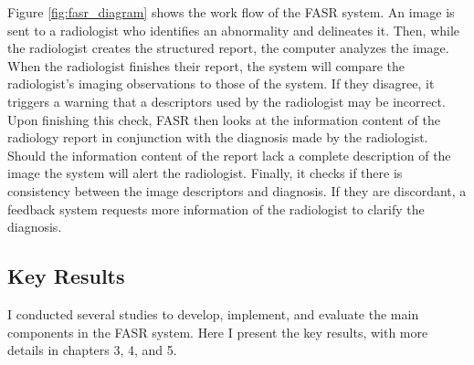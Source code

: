 Figure \ref{fig:fasr_diagram} shows the work flow of the FASR system. 
An image is sent to a radiologist who identifies an abnormality and delineates it. 
Then, while the radiologist creates the structured report, the computer analyzes the image. 
When the radiologist finishes their report, the system will compare the radiologist's imaging observations to those of the system.
If they disagree, it triggers a warning that a descriptors used by the radiologist may be incorrect. 
Upon finishing this check, FASR then looks at the information content of the radiology report in conjunction with the diagnosis made by the radiologist.
Should the information content of the report lack a complete description of the image the system will alert the radiologist.
Finally, it checks if there is consistency between the image descriptors and diagnosis. 
If they are discordant, a feedback system requests more information of the radiologist to clarify the diagnosis.

\subsection{Key Results}

I conducted several studies to develop, implement, and evaluate the main components in the FASR system. 
Here I present the key results, with more details in chapters 3, 4, and 5. 

